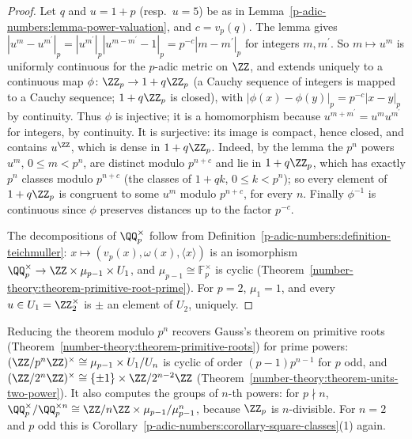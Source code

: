 \begin{proof}
Let $q$ and $u = 1 + p$ (resp.\ $u = 5$) be as in Lemma~\ref{p-adic-numbers:lemma-power-valuation}, and $c = v_p(q)$. The lemma gives $|u^m - u^{m^{\prime}}|_p = |u^{m^{\prime}}|_p|u^{m - m^{\prime}} - 1|_p = p^{-c}|m - m^{\prime}|_p$
for integers $m, m^{\prime}$. So $m \mapsto u^m$ is uniformly continuous for the $p$-adic metric on $\ZZ$, and extends uniquely to a continuous map $\phi \colon \ZZ_p \to 1 + q\ZZ_p$ (a Cauchy sequence of integers is
mapped to a Cauchy sequence; $1 + q\ZZ_p$ is closed), with $|\phi(x) - \phi(y)|_p = p^{-c}|x - y|_p$ by continuity. Thus $\phi$ is injective; it is a homomorphism because $u^{m + m^{\prime}} = u^mu^{m^{\prime}}$
for integers, by continuity. It is surjective: its image is compact, hence closed, and contains $u^{\ZZ}$, which is dense in $1 + q\ZZ_p$. Indeed, by the lemma the $p^n$ powers $u^m$, $0 \leq m < p^n$, are distinct
modulo $p^{n+c}$ and lie in $1 + q\ZZ_p$, which has exactly $p^n$ classes modulo $p^{n+c}$ (the classes of $1 + qk$, $0 \leq k < p^n$); so every element of $1 + q\ZZ_p$ is congruent to some $u^m$
modulo $p^{n+c}$, for every $n$. Finally $\phi^{-1}$ is continuous since $\phi$ preserves distances up to the factor $p^{-c}$.

The decompositions of $\QQ_p^\times$ follow from Definition~\ref{p-adic-numbers:definition-teichmuller}: $x \mapsto (v_p(x), \omega(x), \langle x\rangle)$ is an isomorphism $\QQ_p^\times \to \ZZ \times \mu_{p-1} \times U_1$, and
$\mu_{p-1} \cong \mathbb{F}_p^\times$ is cyclic (Theorem~\ref{number-theory:theorem-primitive-root-prime}). For $p = 2$, $\mu_1 = 1$, and every $u \in U_1 = \ZZ_2^\times$ is $\pm$ an element of $U_2$, uniquely.
\end{proof}

\begin{remark}\label{p-adic-numbers:remark-structure}
Reducing the theorem modulo $p^n$ recovers Gauss's theorem on primitive roots (Theorem~\ref{number-theory:theorem-primitive-roots}) for prime powers: $(\ZZ/p^n\ZZ)^\times \cong \mu_{p-1} \times U_1/U_n$ is cyclic of
order $(p - 1)p^{n-1}$ for $p$ odd, and $(\ZZ/2^n\ZZ)^\times \cong \{\pm1\} \times \ZZ/2^{n-2}\ZZ$ (Theorem~\ref{number-theory:theorem-units-two-power}). It also computes the groups of $n$-th powers: for $p \nmid n$,
$\QQ_p^\times/\QQ_p^{\times n} \cong \ZZ/n\ZZ \times \mu_{p-1}/\mu_{p-1}^n$, because $\ZZ_p$ is $n$-divisible. For $n = 2$ and $p$ odd this is Corollary~\ref{p-adic-numbers:corollary-square-classes}(1) again.
\end{remark}

